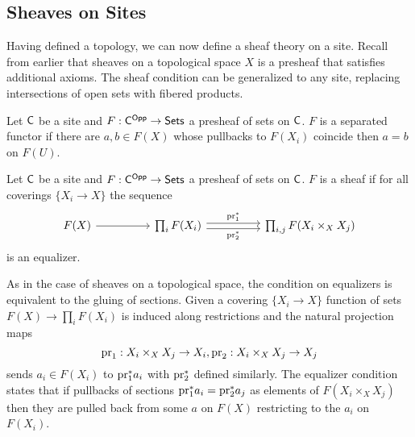 \subsection{Sheaves on Sites}\label{subsec: sheaves on sites}
Having defined a topology, we can now define a sheaf theory on a site. Recall from earlier that sheaves on a topological space $X$ is a presheaf that satisfies additional axioms. The sheaf condition can be generalized to any site, replacing intersections of open sets with fibered products. 
\begin{definition}\label{def: sep presheaf on site}
    Let $\mathsf{C}$ be a site and $F:\mathsf{C}^{\mathsf{Opp}}\to\mathsf{Sets}$ a presheaf of sets on $\mathsf{C}$. $F$ is a separated functor if there are $a,b\in F(X)$ whose pullbacks to $F(X_{i})$ coincide then $a=b$ on $F(U)$. 
\end{definition}
\begin{definition}\label{def: sheaf on site}
    Let $\mathsf{C}$ be a site and $F:\mathsf{C}^{\mathsf{Opp}}\to\mathsf{Sets}$ a presheaf of sets on $\mathsf{C}$. $F$ is a sheaf if for all coverings $\{X_{i}\to X\}$ the sequence 
    $$%
    \begin{tikzcd}
        {F(X)} && {\prod_{i}F(X_{i})} && {\prod_{i,j}F(X_{i}\times_{X}X_{j})}
        \arrow[from=1-1, to=1-3]
        \arrow["{\pr_{1}^{*}}", shift left, from=1-3, to=1-5]
        \arrow["{\pr_{2}^{*}}"', shift right, from=1-3, to=1-5]
    \end{tikzcd}$$
    is an equalizer. 
\end{definition}
\begin{remark}
    As in the case of sheaves on a topological space, the condition on equalizers is equivalent to the gluing of sections. Given a covering $\{X_{i}\to X\}$ function of sets $F(X)\to \prod_{i}F(X_{i})$ is induced along restrictions and the natural projection maps $$\mathrm{pr}_{1}:X_{i}\times_{X}X_{j}\to X_{i},\mathrm{pr}_{2}:X_{i}\times_{X}X_{j}\to X_{j}$$ sends $a_{i}\in F(X_{i})$ to $\mathrm{pr}_{1}^{*}a_{i}$ with $\mathrm{pr}_{2}^{*}$ defined similarly. The equalizer condition states that if pullbacks of sections $\mathrm{pr}_{1}^{*}a_{i}=\mathrm{pr}_{2}^{*}a_{j}$ as elements of $F(X_{i}\times_{X}X_{j})$ then they are pulled back from some $a$ on $F(X)$ restricting to the $a_{i}$ on $F(X_{i})$. 
\end{remark}
